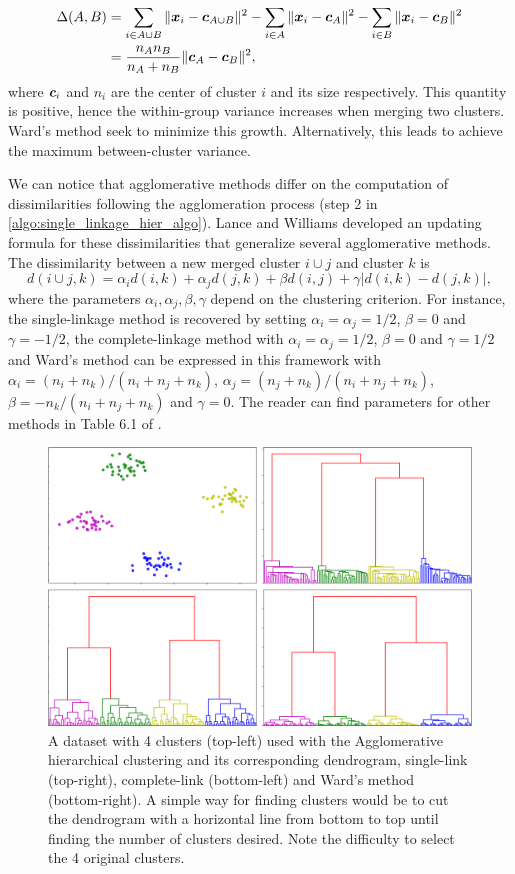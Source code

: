 \begin{align*}
  \Delta(A,B) &= \sum_{i\in A\cup B} \|\boldsymbol x_i - \boldsymbol c_{A \cup B} \|^2-\sum_{i\in A} \|\boldsymbol x_i - \boldsymbol c_{A} \|^2-\sum_{i\in B} \|\boldsymbol x_i - \boldsymbol c_{B} \|^2\\
  &= \frac{n_An_B}{n_A+ n_B}\|\boldsymbol c_A - \boldsymbol c_B \|^2,
\end{align*}
where $\boldsymbol c_i$ and $n_i$ are the center of cluster $i$ and its size respectively.  This quantity is positive, hence the within-group variance increases when merging two clusters. Ward's method seek to minimize this growth. Alternatively, this leads to achieve the maximum between-cluster variance. 

We can notice that agglomerative methods differ on the computation of dissimilarities following the agglomeration process (step 2 in \cref{algo:single_linkage_hier_algo}). Lance and Williams developed an updating formula \citep{lance_williams_67} for these dissimilarities that generalize several agglomerative methods. The dissimilarity between a new merged cluster $i \cup j$ and cluster $k$ is
\begin{equation}
  d(i \cup j,k) = \alpha_i d(i,k)+\alpha_jd(j,k)+\beta d(i, j) +\gamma |d(i,k)-d(j,k)|,
\end{equation}
where the parameters $\alpha_i , \alpha_j, \beta, \gamma$ depend on the clustering criterion. For instance, the single-linkage method is recovered by setting $\alpha_i =\alpha_j = 1/2$, $\beta =0$ and $\gamma =-1/2$, the complete-linkage method with $\alpha_i =\alpha_j = 1/2$, $\beta =0$ and $\gamma =1/2$ and Ward's method can be expressed in this framework \citep{Batagelj88generalizedward,f.1985multidimensional,jambu1989exploration} with $\alpha_i=(n_i+n_k)/(n_i+n_j+n_k)$, $\alpha_j=(n_j+n_k)/(n_i+n_j+n_k)$, $\beta=-n_k/(n_i+n_j+n_k)$ and $\gamma=0$. The reader can find parameters for other methods in Table 6.1 of \citep{hennig2015handbook}.
 \begin{figure}[h]
 \center
 \includegraphics[scale=0.35]{TeX_files/dendrogram.png}
 \caption{A dataset with 4 clusters (top-left) used with the Agglomerative hierarchical clustering and its corresponding dendrogram, single-link (top-right), complete-link (bottom-left) and Ward's method (bottom-right). A simple way for finding clusters would be to cut the dendrogram with a horizontal line from bottom to top until finding the number of clusters desired. Note the difficulty to select the 4 original clusters.}
 \label{dendrogram_graph}
 \end{figure}
